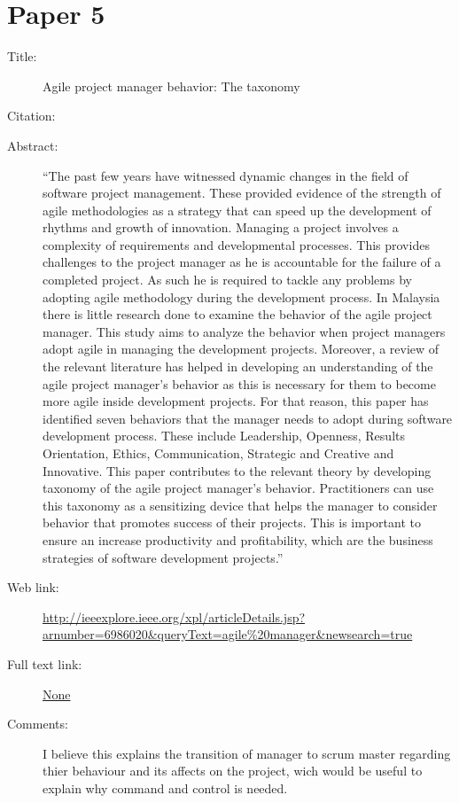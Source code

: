 \documentclass{scrartcl}
\begin{document}
\section*{Paper 5}
\begin{description}
	\item[Title:] Agile project manager behavior: The taxonomy 
	\item[Citation:] \cite{Behavior}
	\item[Abstract:] ``The past few years have witnessed dynamic changes in the field of software project management. These provided evidence of the strength of agile methodologies as a strategy that can speed up the development of rhythms and growth of innovation. Managing a project involves a complexity of requirements and developmental processes. This provides challenges to the project manager as he is accountable for the failure of a completed project. As such he is required to tackle any problems by adopting agile methodology during the development process. In Malaysia there is little research done to examine the behavior of the agile project manager. This study aims to analyze the behavior when project managers adopt agile in managing the development projects. Moreover, a review of the relevant literature has helped in developing an understanding of the agile project manager's behavior as this is necessary for them to become more agile inside development projects. For that reason, this paper has identified seven behaviors that the manager needs to adopt during software development process. These include Leadership, Openness, Results Orientation, Ethics, Communication, Strategic and Creative and Innovative. This paper contributes to the relevant theory by developing taxonomy of the agile project manager's behavior. Practitioners can use this taxonomy as a sensitizing device that helps the manager to consider behavior that promotes success of their projects. This is important to ensure an increase productivity and profitability, which are the business strategies of software development projects.''
	\item[Web link:] \url{http://ieeexplore.ieee.org/xpl/articleDetails.jsp?arnumber=6986020&queryText=agile%20manager&newsearch=true}
	\item[Full text link:] \url{None}
	\item[Comments:] I believe this explains the transition of manager to scrum master regarding thier behaviour and its affects on the project, wich would be useful to explain why command and control is needed.
\end{description}
\end{document}
